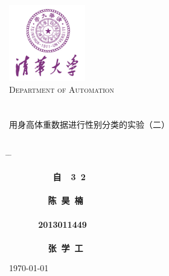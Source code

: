 


\begin{titlepage}
\begin{center}
\includegraphics[width=0.25\textwidth]{resource/logo.jpg}\\[1cm]
\textsc{\LARGE Department of Automation}\\[1.5cm]
\\[0.5cm]
\hrulefill
\\[0.8cm]{\centering \huge \hei 用身高体重数据进行性别分类的实验（二）}\\[0.4cm]
\hrulefill
\\[4cm]

\begin{tabbing}       %

 \hspace*{5cm} \= \hspace{2.6cm} \= \kill

\>  {\centering\fs\sihao\textbf{~~~~~~~~~自~~3~2}} \\
\\
\>  {\centering\fs\sihao\textbf{~~~~~~~~陈~昊~楠}}\\
\\
\>  {\centering\fs\sihao\textbf{~~~~~~2013011449}}\\
\\
\>  {\centering\fs\sihao\textbf{~~~~~~~~张~学~工}} \\

\end{tabbing}
\vfill
{\large \today}
\end{center}
\end{titlepage}


